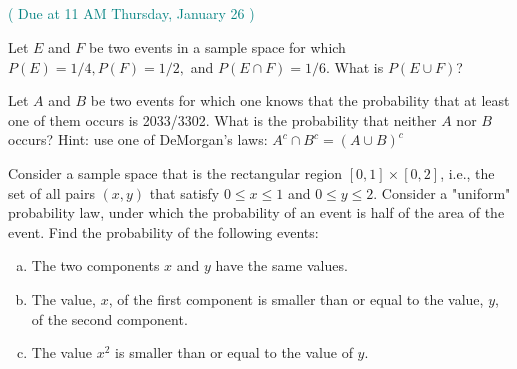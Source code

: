 \documentclass[12pt]{article}
\newenvironment{question}[2][Question]{\begin{trivlist}
\item[\hskip \labelsep {\bfseries #1}\hskip \labelsep {\bfseries #2.}]}{\end{trivlist}}
\begin{document}
\subsection*{}
\centering\textcolor{teal}{( Due at 11 AM Thursday, January 26 )}
\vspace{5mm}


 \begin{question}{1} Let $E$ and $F$ be two events in a sample space for which $P(E) = 1/4, P(F) = 1/2,$ and $P(E \cap F) = 1/6$. What is $P(E \cup F)$? 
\end{question} 

\vspace{5mm}


 \begin{question}{2} Let $A$ and $B$ be two events for which one knows that the probability that at least one of them occurs is 2033/3302. What is the probability that neither $A$ nor $B$ occurs? Hint: use one of DeMorgan's  laws: $A^c \cap B^c = (A \cup B)^c$ 
\end{question} 


\vspace{5mm}

\begin{question}{3} Consider a sample space that is the rectangular region
$[0, 1] \times [0, 2]$, i.e., the set of all pairs $(x, y)$ that satisfy $0 \leq x \leq 1$ and $0 \leq y \leq 2$.
 Consider a "uniform" probability law, under which the probability of an event is half of the area of the event. 
 Find the probability of the following events:
 \begin{enumerate}[(a)]
 \item The two components $x$ and $y$ have the same values.
 \item The value, $x$, of the first component is smaller than or equal to the value, $y$, of the second component.
  \item The value $x^2$ is smaller than or equal to the value of $y$. 
 \end{enumerate}

\end{question} 

\pagebreak
\end{document}
